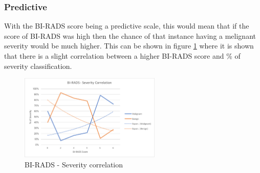 \documentclass[12pt]{article}
\begin{document}
      \subsubsection{Predictive}
        With the BI-RADS score being a predictive scale, this would mean that if the score of BI-RADS was high then the chance of that instance having a melignant severity would be much higher. This can be shown in figure \ref{fig:birads-severity-correlation} where it is shown that there is a slight correlation between a higher BI-RADS score and \% of severity classification.

        \begin{figure}[H]
          \centering
          \includegraphics[width=0.6\textwidth]{birads-severity-correlation}
          \caption{BI-RADS - Severity correlation}
          \label{fig:birads-severity-correlation}
        \end{figure}
\end{document}
